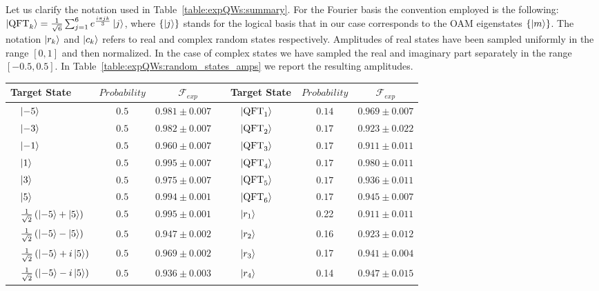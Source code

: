 Let us clarify the notation used in Table~\ref{table:expQWs:summary}. For the Fourier basis the convention employed is the following: $\ket{\operatorname{QFT}_k}=\frac{1}{\sqrt{6}}\sum_{j=1}^{6}e^{\frac{ i \pi jk }{3}}\ket{j}$, where $\{\ket{j}\}$ stands for the logical basis that in our case corresponds to the \ac{OAM} eigenstates $\{\ket{m} \}$. The notation $\ket{r_k}$ and $\ket{c_k}$ refers to real and complex random states respectively. Amplitudes of real states have been sampled uniformly in the range $\left[0,1\right]$ and then normalized. In the case of complex states we have sampled the real and imaginary part separately in the range $\left[-0.5,0.5\right]$. In Table~\ref{table:expQWs:random_states_amps} we report the resulting amplitudes.

\begin{table}[tbh]
\centering\footnotesize
\begin{tabular}{lcc|lcc}
\toprule
Target State & $Probability$  & $\mathcal{F}_{exp}$  & Target State & $Probability$  & $\mathcal{F}_{exp}$ \\
\midrule
 $\quad\ket{-5}$ & $0.5$  & $0.981 \pm 0.007\quad$ &$\quad\ket{\operatorname{QFT}_1}\qquad $ & $0.14$ & $0.969\pm 0.007$\\
 $\quad\ket{-3}$ & $0.5$ & $0.982 \pm 0.007\quad$ &$\quad\ket{\operatorname{QFT}_2}$ & $0.17$ & $0.923\pm 0.022$ \\
 $\quad\ket{-1}$ & $0.5$ & $0.960 \pm 0.007\quad$ &$\quad\ket{\operatorname{QFT}_3}$ & $0.17$ & $0.911\pm 0.011$\\ 
 $\quad\ket{1}$ & $0.5$ & $0.995 \pm 0.007\quad$ & $\quad\ket{\operatorname{QFT}_4}$&$0.17$ &  $0.980\pm 0.011$ \\
 $\quad\ket{3}$ & $0.5$ & $0.975 \pm 0.007\quad$ & $\quad\ket{\operatorname{QFT}_5 }$& $0.17$& $0.936\pm 0.011$ \\
 $\quad\ket{5}$ & $0.5$ & $0.994 \pm 0.001\quad$ & $\quad\ket{\operatorname{QFT}_6} $& $0.17$ & $0.945\pm 0.007$ \\
 $\quad\frac{1}{\sqrt{2}}\left(\ket{-5}+\ket{5} \right)$ & $0.5$  & $0.995 \pm 0.001\quad$ &$\quad\ket{r_1}$ & 0.22& $0.911\pm0.011$\\
 $\quad\frac{1}{\sqrt{2}}\left(\ket{-5}-\ket{5}\right)$ & $0.5$ & $0.947 \pm 0.002\quad$ &$\quad\ket{r_2}$  & 0.16 & $0.923 \pm 0.012$\\
 $\quad\frac{1}{\sqrt{2}}\left(\ket{-5}+i\ket{5}\right)$ & $0.5$ & $0.969 \pm 0.002\quad$ &$\quad\ket{r_3}$  & 0.17 & $0.941 \pm 0.004$\\ 
  $\quad\frac{1}{\sqrt{2}}\left(\ket{-5}-i\ket{5}\right)$ & $0.5$ & $0.936 \pm 0.003\quad$&$\quad\ket{r_4} $& 0.14 &$0.947 \pm 0.015$  \\

\end{tabular}
\end{table}
